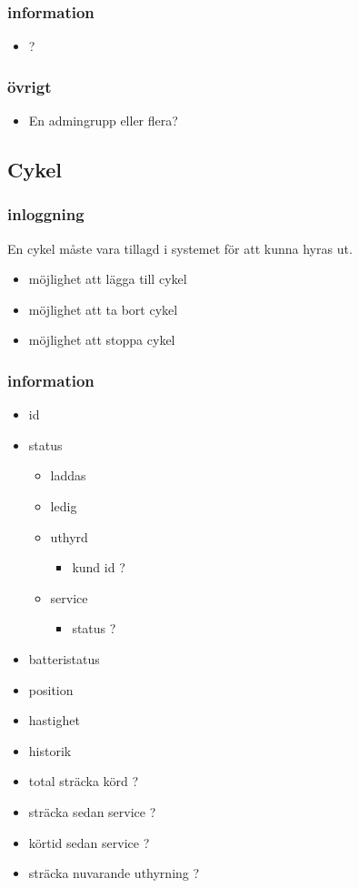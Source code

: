 \documentclass[11pt]{article}
\begin{document}
\subsubsection{information}
\label{sec:orgc2a462b}
\begin{itemize}
\item ?
\end{itemize}

\subsubsection{övrigt}
\label{sec:org41d8571}
\begin{itemize}
\item En admingrupp eller flera?
\end{itemize}

\subsection{Cykel}
\label{sec:org14ab366}

\subsubsection{inloggning}
\label{sec:org21003fa}
En cykel måste vara tillagd i systemet för att kunna hyras ut.
\begin{itemize}
\item möjlighet att lägga till cykel
\item möjlighet att ta bort cykel
\item möjlighet att stoppa cykel
\end{itemize}

\subsubsection{information}
\label{sec:orgd0b625e}
\begin{itemize}
\item id
\item status
\begin{itemize}
\item laddas
\item ledig
\item uthyrd
\begin{itemize}
\item kund id ?
\end{itemize}
\item service
\begin{itemize}
\item status ?
\end{itemize}
\end{itemize}
\item batteristatus
\item position
\item hastighet
\item historik
\item total sträcka körd ?
\item sträcka sedan service ?
\item körtid sedan service ?
\item sträcka nuvarande uthyrning ?
\end{itemize}
\end{document}
